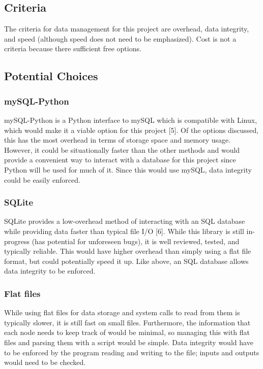 \documentclass[onecolumn, draftclsnofoot,10pt, compsoc]{IEEEtran}
\begin{document}
\subsection{Criteria}
The criteria for data management for this project are overhead, data integrity, and speed (although speed does not need to be emphasized). Cost is not a criteria because there sufficient free options.


\subsection{Potential Choices}
\subsubsection{mySQL-Python}
mySQL-Python is a Python interface to mySQL which is compatible with Linux, which would make it a viable option for this project [5]. Of the options discussed, this has the most overhead in terms of storage space and memory usage. However, it could be situationally faster than the other methods and would provide a convenient way to interact with a database for this project since Python will be used for much of it. Since this would use mySQL, data integrity could be easily enforced. 



\subsubsection{SQLite}
SQLite provides a low-overhead method of interacting with an SQL database while providing data faster than typical file I/O [6]. While this library is still in-progress (has potential for unforeseen bugs), it is well reviewed, tested, and typically reliable. This would have higher overhead than simply using a flat file format, but could potentially speed it up. Like above, an SQL database allows data integrity to be enforced.


\subsubsection{Flat files}
While using flat files for data storage and system calls to read from them is typically slower, it is still fast on small files. Furthermore, the information that each node needs to keep track of would be minimal, so managing this with flat files and parsing them with a script would be simple. Data integrity would have to be enforced by the program reading and writing to the file; inputs and outputs would need to be checked. 
\end{document}
